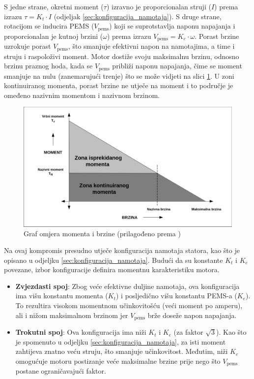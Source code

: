 \documentclass[diplomskirad]{fer}
\begin{document}
S jedne strane, okretni moment ($\tau$) izravno je proporcionalan struji ($I$)
prema izrazu $\tau = K_t \cdot I$ (odjeljak \ref{sec:konfiguracija_namotaja}).
S druge strane, rotacijom se inducira PEMS ($V_{\text{pems}}$) koji se
suprotstavlja naponu napajanja i proporcionalan je kutnoj brzini ($\omega$)
prema izrazu $V_{\text{pems}} = K_e \cdot \omega$. Porast brzine uzrokuje
porast $V_{\text{pems}}$, što smanjuje efektivni napon na namotajima, a time i
struju i raspoloživi moment. Motor dostiže svoju maksimalnu brzinu, odnosno
brzinu praznog hoda, kada se $V_{\text{pems}}$ približi naponu napajanja, čime
se moment smanjuje na nulu (zanemarujući trenje) što se može vidjeti na slici
\ref{fig:torque_speed}. U zoni kontinuiranog momenta, porast brzine ne utječe
na moment i to područje je omeđeno nazivnim momentom i nazivnom brzinom.

\begin{figure}[h!]
	\centering
	\includegraphics[width=\textwidth]{Figures/microchip_torque_speed.png}
	\caption{Graf omjera momenta i brzine (prilagođeno prema \cite{MicrochipAN885})}
	\label{fig:torque_speed}
\end{figure}

Na ovaj kompromis presudno utječe konfiguracija namotaja statora, kao što je
opisano u odjeljku \ref{sec:konfiguracija_namotaja}. Budući da su konstante
$K_t$ i $K_e$ povezane, izbor konfiguracije definira momentnu karakteristiku
motora.

\begin{itemize}

	\item \textbf{Zvjezdasti spoj}: Zbog veće efektivne duljine namotaja, ova konfiguracija ima višu konstantu momenta ($K_t$) i posljedično višu konstantu PEMS-a ($K_e$). To rezultira visokom momentnom učinkovitošću (veći moment po amperu), ali i nižom maksimalnom brzinom jer $V_{\text{pems}}$ brže doseže napon napajanja.

	\item \textbf{Trokutni spoj}: Ova konfiguracija ima niži $K_t$ i $K_e$ (za faktor $\sqrt{3}$). Kao što je spomenuto u odjeljku \ref{sec:konfiguracija_namotaja}, za isti moment zahtijeva znatno veću struju, što smanjuje učinkovitost. Međutim, niži $K_e$ omogućuje motoru postizanje veće maksimalne brzine prije nego što $V_{\text{pems}}$ postane ograničavajući faktor.

\end{itemize}
\end{document}
